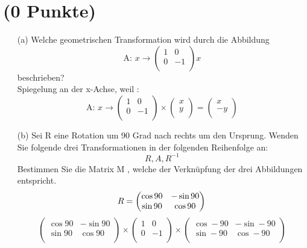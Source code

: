 \documentclass[11pt]{article}
\begin{document}
\section{(0 Punkte)}
\begin{enumerate}
\item[(a)] Welche geometrischen Transformation wird durch die Abbildung
$$ \text{A: } x \rightarrow \begin{pmatrix}
1&0\\ 
0&-1\\
\end{pmatrix}x$$
beschrieben?\\
Spiegelung an der x-Achse, weil :
$$ \text{A: } x \rightarrow \begin{pmatrix}
1&0\\ 
0&-1\\
\end{pmatrix}
\times
\begin{pmatrix}
x \\ y \\
\end{pmatrix} = \begin{pmatrix}
x \\ -y\\
\end{pmatrix} $$
\item[(b)] Sei R eine Rotation um 90 Grad nach rechts um den Ursprung. Wenden Sie folgende drei Transformationen in der folgenden Reihenfolge an:
$$R,A,R^{-1}$$
Bestimmen Sie die Matrix M , welche der Verknüpfung der drei Abbildungen entspricht.\\
$$
R =
\begin{pmatrix}
\cos 90 & -\sin 90 \\
\sin 90 & \cos 90 \\
\end{pmatrix}\\
$$
$$ 
\begin{pmatrix}
\cos 90 & -\sin 90 \\
\sin 90 & \cos 90 \\
\end{pmatrix}
\times
\begin{pmatrix}
1 & 0 \\
0 & -1 \\
\end{pmatrix}
\times
\begin{pmatrix}
\cos -90 & -\sin -90 \\
\sin -90 & \cos -90 \\
\end{pmatrix}
$$
\end{enumerate}
\end{document}

